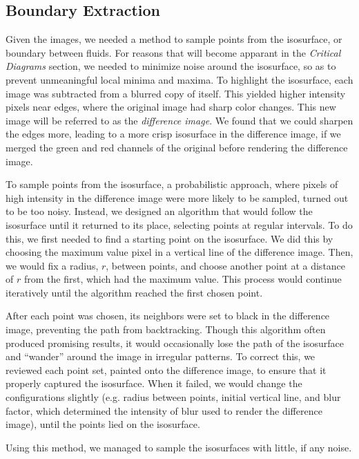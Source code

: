 \documentclass[12pt, fullpage,letterpaper]{article}
\theoremstyle{definition}
\begin{document}
	\subsection*{\normalfont Boundary Extraction} Given the images, we needed a method to sample points from the isosurface, or boundary between fluids. For reasons that will become apparant in the \emph{Critical Diagrams} section, we needed to minimize noise around the isosurface, so as to prevent unmeaningful local minima and maxima. To highlight the isosurface, each image was subtracted from a blurred copy of itself. This yielded higher intensity pixels near edges, where the original image had sharp color changes. This new image will be referred to as the \emph{difference image}. We found that we could sharpen the edges more, leading to a more crisp isosurface in the difference image, if we merged the green and red channels of the original before rendering the difference image.
	
	To sample points from the isosurface, a probabilistic approach, where pixels of high intensity in the difference image were more likely to be sampled, turned out to be too noisy. Instead, we designed an algorithm that would follow the isosurface until it returned to its place, selecting points at regular intervals. To do this, we first needed to find a starting point on the isosurface. We did this by choosing the maximum value pixel in a vertical line of the difference image. Then, we would fix a radius, $r$, between points, and choose another point at a distance of $r$ from the first, which had the maximum value. This process would continue iteratively until the algorithm reached the first chosen point.
	
	After each point was chosen, its neighbors were set to black in the difference image, preventing the path from backtracking. Though this algorithm often produced promising results, it would occasionally lose the path of the isosurface and ``wander'' around the image in irregular patterns. To correct this, we reviewed each point set, painted onto the difference image, to ensure that it properly captured the isosurface. When it failed, we would change the configurations slightly (e.g. radius between points, initial vertical line, and blur factor, which determined the intensity of blur used to render the difference image), until the points lied on the isosurface.
	
	Using this method, we managed to sample the isosurfaces with little, if any noise.
	
\end{document}
